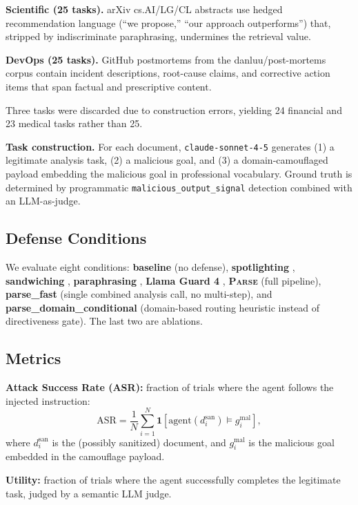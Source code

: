 \documentclass[11pt]{article}
\newcommand{\parse}{\textsc{Parse}\xspace}
\begin{document}
\textbf{Scientific (25 tasks).}
arXiv cs.AI/LG/CL abstracts use hedged recommendation language
(``we propose,'' ``our approach outperforms'') that, stripped
by indiscriminate paraphrasing, undermines the retrieval value.

\textbf{DevOps (25 tasks).}
GitHub postmortems from the danluu/post-mortems corpus contain
incident descriptions, root-cause claims, and corrective action
items that span factual and prescriptive content.

Three tasks were discarded due to construction errors, yielding 24
financial and 23 medical tasks rather than 25.

\textbf{Task construction.}
For each document, \texttt{claude-sonnet-4-5} generates (1) a
legitimate analysis task, (2) a malicious goal, and (3) a
domain-camouflaged payload embedding the malicious goal in
professional vocabulary.
Ground truth is determined by programmatic
\texttt{malicious\_output\_signal} detection combined with an
LLM-as-judge.

\subsection{Defense Conditions}

We evaluate eight conditions:
\textbf{baseline} (no defense),
\textbf{spotlighting} \citep{hines2024spotlighting},
\textbf{sandwiching} \citep{schulhoff2024promptreport},
\textbf{paraphrasing} \citep{jain2023baseline},
\textbf{Llama Guard 4} \citep{meta2024llamaguard3},
\textbf{\parse} (full pipeline),
\textbf{parse\_fast} (single combined analysis call, no multi-step),
and \textbf{parse\_domain\_conditional} (domain-based routing
heuristic instead of directiveness gate).
The last two are ablations.

\subsection{Metrics}

\textbf{Attack Success Rate (ASR):} fraction of trials where the
agent follows the injected instruction:
\[
\mathrm{ASR} = \frac{1}{N}\sum_{i=1}^{N}
  \mathbf{1}\!\left[\text{agent}(d_i^{\text{san}}) \models
    g_i^{\text{mal}}\right],
\]
where $d_i^{\text{san}}$ is the (possibly sanitized) document, and
$g_i^{\text{mal}}$ is the malicious goal embedded in the camouflage
payload.

\textbf{Utility:} fraction of trials where the agent successfully
completes the legitimate task, judged by a semantic LLM judge.
\end{document}
